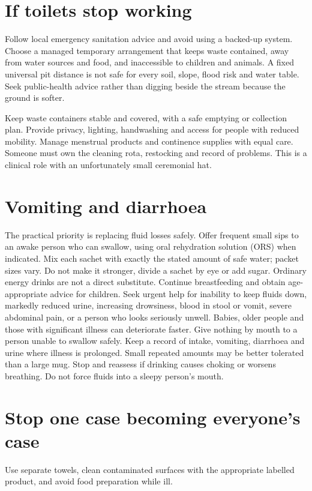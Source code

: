 \documentclass[10pt,openright]{book}
\begin{document}
\section*{If toilets stop working}
Follow local emergency sanitation advice and avoid using a backed-up system. Choose a managed temporary arrangement that keeps waste contained, away from water sources and food, and inaccessible to children and animals. A fixed universal pit distance is not safe for every soil, slope, flood risk and water table. Seek public-health advice rather than digging beside the stream because the ground is softer.

Keep waste containers stable and covered, with a safe emptying or collection plan. Provide privacy, lighting, handwashing and access for people with reduced mobility. Manage menstrual products and continence supplies with equal care. Someone must own the cleaning rota, restocking and record of problems. This is a clinical role with an unfortunately small ceremonial hat.

\section*{Vomiting and diarrhoea}
The practical priority is replacing fluid losses safely. Offer frequent small sips to an awake person who can swallow, using oral rehydration solution (ORS) when indicated. Mix each sachet with exactly the stated amount of safe water; packet sizes vary. Do not make it stronger, divide a sachet by eye or add sugar. Ordinary energy drinks are not a direct substitute. Continue breastfeeding and obtain age-appropriate advice for children. Seek urgent help for inability to keep fluids down, markedly reduced urine, increasing drowsiness, blood in stool or vomit, severe abdominal pain, or a person who looks seriously unwell. Babies, older people and those with significant illness can deteriorate faster. Give nothing by mouth to a person unable to swallow safely. Keep a record of intake, vomiting, diarrhoea and urine where illness is prolonged. Small repeated amounts may be better tolerated than a large mug. Stop and reassess if drinking causes choking or worsens breathing. Do not force fluids into a sleepy person's mouth.

\section*{Stop one case becoming everyone's case}
Use separate towels, clean contaminated surfaces with the appropriate labelled product, and avoid food preparation while ill.
\end{document}
